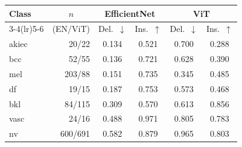 \begin{tabular}{lrcccc}
\toprule
\multirow{2}{*}{Class} & \multicolumn{1}{c}{$n$} & \multicolumn{2}{c}{EfficientNet} & \multicolumn{2}{c}{ViT} \\
\cmidrule(lr){3-4}\cmidrule(lr){5-6}
 & (EN/ViT) & Del.\ $\downarrow$ & Ins.\ $\uparrow$ & Del.\ $\downarrow$ & Ins.\ $\uparrow$ \\
\midrule
akiec & 20/22 & 0.134 & 0.521 & 0.700 & 0.288 \\
bcc & 52/55 & 0.136 & 0.721 & 0.628 & 0.390 \\
mel & 203/88 & 0.151 & 0.735 & 0.345 & 0.485 \\
df & 19/15 & 0.187 & 0.753 & 0.573 & 0.468 \\
bkl & 84/115 & 0.309 & 0.570 & 0.613 & 0.856 \\
vasc & 24/16 & 0.488 & 0.971 & 0.805 & 0.783 \\
nv & 600/691 & 0.582 & 0.879 & 0.965 & 0.803 \\
\bottomrule
\end{tabular}

